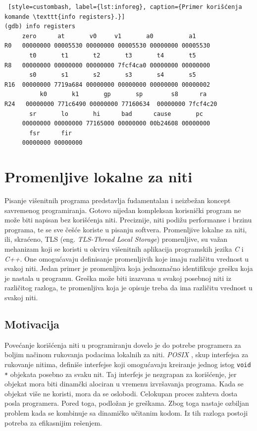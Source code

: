 \documentclass[12pt,oneside]{memoir}
\begin{document}
\begin{lstlisting} [style=custombash, label={lst:inforeg}, caption={Primer korišćenja komande \texttt{info registers}.}]
(gdb) info registers 
	 zero      at       v0     v1       a0	        a1       
R0   00000000 00005530 00000000 00005530 00000000 00005530
       t0       t1       t2       t3       t4       t5       
R8   00000000 00000000 00000000 7fcf4ca0 00000000 00000000
       s0       s1       s2       s3       s4       s5       
R16  00000000 7719a684 00000000 00000000 00000000 00000002
          k0       k1       gp       sp        s8      ra
R24   00000000 771c6490 00000000 77160634  00000000 7fcf4c20
       sr       lo       hi      bad      cause       pc
     00000000 00000000 77165000 00000000 00b24608 00000000 
       fsr      fir
     00000000 00000000
\end{lstlisting}

\chapter{Promenljive lokalne za niti}
\label{chp:TLS}

Pisanje višenitnih programa predstavlja fudamentalan i neizbežan koncept savremenog programiranja. Gotovo nijedan kompleksan korisnički program ne može biti napisan bez korišćenja niti. Preciznije, niti podižu performanse i brzinu programa, te se sve češće koriste u pisanju softvera. Promenljive lokalne za niti, ili, skraćeno, TLS (eng. \emph{TLS-Thread Local Storage}) promenljive, su važan mehanizam koji se koristi u okviru višenitnih aplikacija programskih jezika \emph{C} i \emph{C++}. One omogućavaju definisanje promenljivih koje imaju različitu vrednost u svakoj niti. Jedan primer je promenljiva koja jednoznačno identifikuje grešku koja je nastala u programu. Greška može biti izazvana u svakoj posebnoj niti iz različitog razloga, te promenljiva koja je opisuje treba da ima različitu vrednost u svakoj niti.

\section{Motivacija}

Povećanje korišćenja niti u programiranju dovelo je do potrebe programera za boljim načinom rukovanja podacima lokalnih za niti. \emph{POSIX} \cite{POSIX}, skup interfejsa za rukovanje nitima, definiše interfejse koji omogućavaju kreiranje jednog istog \texttt{void *} objekata posebno za svaku nit. Taj interfejs je nezgrapan za korišćenje, jer objekat mora biti dinamčki alociran u vremenu izvršavanja programa. Kada se objekat više ne koristi, mora da se oslobodi. Celokupan proces zahteva dosta posla programera. Pored toga, podložan je greškama. Zbog toga nastaje ozbiljan problem kada se kombinuje sa dinamičko učitanim kodom. Iz tih razloga postoji potreba za efikasnijim rešenjem.
\end{document}
